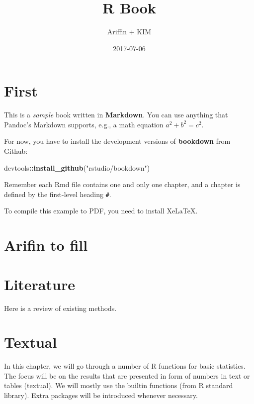 \documentclass[]{book}
\title{R Book}
\author{Ariffin + KIM}
\date{2017-07-06}
\newenvironment{Shaded}{\begin{snugshade}}{\end{snugshade}}
\newcommand{\KeywordTok}[1]{\textcolor[rgb]{0.13,0.29,0.53}{\textbf{#1}}}
\newcommand{\StringTok}[1]{\textcolor[rgb]{0.31,0.60,0.02}{#1}}
\newcommand{\OperatorTok}[1]{\textcolor[rgb]{0.81,0.36,0.00}{\textbf{#1}}}
\newcommand{\NormalTok}[1]{#1}
\theoremstyle{definition}
\theoremstyle{definition}
\theoremstyle{remark}
\begin{document}
\maketitle

{
\setcounter{tocdepth}{1}
\tableofcontents
}
\chapter{First}\label{first}

This is a \emph{sample} book written in \textbf{Markdown}. You can use
anything that Pandoc's Markdown supports, e.g., a math equation
\(a^2 + b^2 = c^2\).

For now, you have to install the development versions of
\textbf{bookdown} from Github:

\begin{Shaded}
\begin{Highlighting}[]
\NormalTok{devtools}\OperatorTok{::}\KeywordTok{install_github}\NormalTok{(}\StringTok{"rstudio/bookdown"}\NormalTok{)}
\end{Highlighting}
\end{Shaded}

Remember each Rmd file contains one and only one chapter, and a chapter
is defined by the first-level heading \texttt{\#}.

To compile this example to PDF, you need to install XeLaTeX.

\chapter{Arifin to fill}\label{arifin-to-fill}

\chapter{Literature}\label{literature}

Here is a review of existing methods.

\chapter{Textual}\label{textual}

In this chapter, we will go through a number of R functions for basic
statistics. The focus will be on the results that are presented in form
of numbers in text or tables (textual). We will mostly use the builtin
functions (from R standard library). Extra packages will be introduced
whenever necessary.
\end{document}
